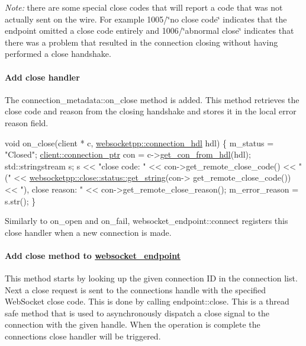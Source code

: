 {\itshape Note\+:} there are some special close codes that will report a code that was not actually sent on the wire. For example 1005/\char`\"{}no close code\char`\"{} indicates that the endpoint omitted a close code entirely and 1006/\char`\"{}abnormal close\char`\"{} indicates that there was a problem that resulted in the connection closing without having performed a close handshake.

\paragraph*{Add close handler}

The {\ttfamily connection\+\_\+metadata\+::on\+\_\+close} method is added. This method retrieves the close code and reason from the closing handshake and stores it in the local error reason field.


\begin{DoxyCode}
\textcolor{keywordtype}{void} on\_close(client * c, \hyperlink{namespacewebsocketpp_a6b3d26a10ee7229b84b776786332631d}{websocketpp::connection\_hdl} hdl) \{
    m\_status = \textcolor{stringliteral}{"Closed"};
    \hyperlink{classwebsocketpp_1_1client_a2e187bbb2beac676bbfbc2e8065de83e}{client::connection\_ptr} con = c->\hyperlink{classwebsocketpp_1_1endpoint_a0fe4457427d4124abe7ca022ba7afbb4}{get\_con\_from\_hdl}(hdl);
    std::stringstream s;
    s << \textcolor{stringliteral}{"close code: "} << con->get\_remote\_close\_code() << \textcolor{stringliteral}{" ("} 
      << \hyperlink{namespacewebsocketpp_1_1close_1_1status_a4bf4987c79165b134ed1207a567ce209}{websocketpp::close::status::get\_string}(con->
      get\_remote\_close\_code()) 
      << \textcolor{stringliteral}{"), close reason: "} << con->get\_remote\_close\_reason();
    m\_error\_reason = s.str();
\}
\end{DoxyCode}


Similarly to {\ttfamily on\+\_\+open} and {\ttfamily on\+\_\+fail}, {\ttfamily websocket\+\_\+endpoint\+::connect} registers this close handler when a new connection is made.

\paragraph*{Add close method to {\ttfamily \hyperlink{classwebsocket__endpoint}{websocket\+\_\+endpoint}}}

This method starts by looking up the given connection ID in the connection list. Next a close request is sent to the connection\textquotesingle{}s handle with the specified Web\+Socket close code. This is done by calling {\ttfamily endpoint\+::close}. This is a thread safe method that is used to asynchronously dispatch a close signal to the connection with the given handle. When the operation is complete the connection\textquotesingle{}s close handler will be triggered.


